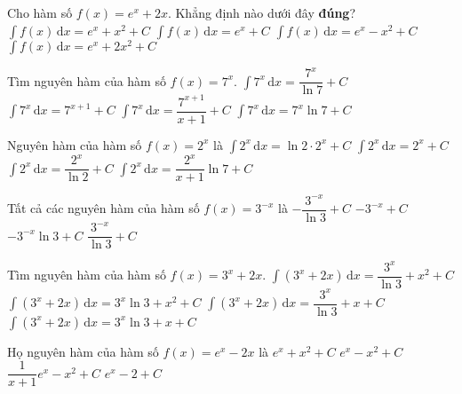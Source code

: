 \begin{ex}%
Cho hàm số $f(x)=e^x+2x$. Khẳng định nào dưới đây \textbf{đúng}?
\choice
{\True $\displaystyle\int f(x) \mathrm{\,d}x=e^{x}+x^2+C$}
{$\displaystyle\int f(x) \mathrm{\,d}x=e^{x}+C$}
{$\displaystyle\int f(x) \mathrm{\,d}x=e^{x}-x^2+C$}
{$\displaystyle\int f(x) \mathrm{\,d}x=e^{x}+2x^2+C$}
\end{ex}

\begin{ex}%
Tìm nguyên hàm của hàm số  $f(x)=7^x$.
\choice
{\True $\displaystyle\int 7^x \mathrm{\,d}x=\dfrac{7^x}{\ln 7}+C$}
{$\displaystyle\int 7^x \mathrm{\,d}x=7^{x+1}+C$}
{$\displaystyle\int 7^x \mathrm{\,d}x=\dfrac{7^{x+1}}{x+1}+C$}
{$\displaystyle\int 7^x \mathrm{\,d}x=7^x\ln 7+C$}
\end{ex}

\begin{ex}%
Nguyên hàm của hàm số  $f(x)=2^x$ là
\choice
{$\displaystyle\int 2^x \mathrm{\,d}x=\ln 2\cdot 2^x+C$}
{$\displaystyle\int 2^x \mathrm{\,d}x=2^x+C$}
{\True $\displaystyle\int 2^x \mathrm{\,d}x=\dfrac{2^{x}}{\ln 2}+C$}
{$\displaystyle\int 2^x \mathrm{\,d}x=\dfrac{2^x}{x+1}\ln 7+C$}
\end{ex}

\begin{ex}%
Tất cả các nguyên hàm của hàm số  $f(x)=3^{-x}$ là
\choice
{\True $-\dfrac{3^{-x}}{\ln 3}+C$}
{$-3^{-x}+C$}
{$-3^{-x}\ln 3+C$}
{$\dfrac{3^{-x}}{\ln 3}+C$}
\end{ex}

\begin{ex}%
Tìm nguyên hàm của hàm số $f(x)=3^x+2x$.
\choice
{\True $\displaystyle\int (3^x+2x) \mathrm{\,d}x=\dfrac{3^x}{\ln 3}+x^2+C$}
{$\displaystyle\int (3^x+2x) \mathrm{\,d}x=3^x\ln 3+x^2+C$}
{$\displaystyle\int (3^x+2x) \mathrm{\,d}x=\dfrac{3^x}{\ln 3}+x+C$}
{$\displaystyle\int (3^x+2x) \mathrm{\,d}x=3^x\ln 3+x+C$}
\end{ex}

\begin{ex}%
Họ nguyên hàm của hàm số $f(x)=e^x-2x$ là
\choice
{$e^x+x^2+C$}
{\True $e^x-x^2+C$}
{$\dfrac{1}{x+1}e^x-x^2+C$}
{$e^x-2+C$}
\end{ex}

